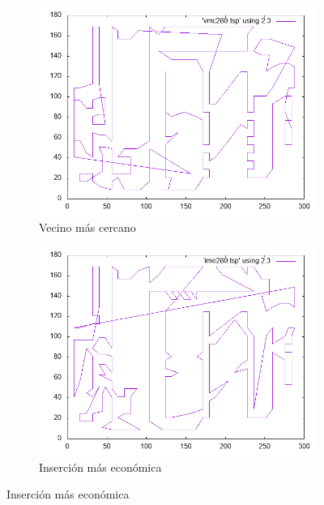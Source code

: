 \documentclass[12pt,spanish]{article}
\begin{document}
\begin{figure}[H]
\centering
\begin{subfigure}[b]{0.36\textwidth}
\includegraphics[width=\textwidth]{a280_vmc.png}
\caption{Vecino más cercano}
\end{subfigure}
\quad

\begin{subfigure}[b]{0.36\textwidth}
\includegraphics[width=\textwidth]{a280_ime.png}
\caption{Inserción más económica}
\end{subfigure}

\vspace{1cm}


\end{figure}
\end{document}
